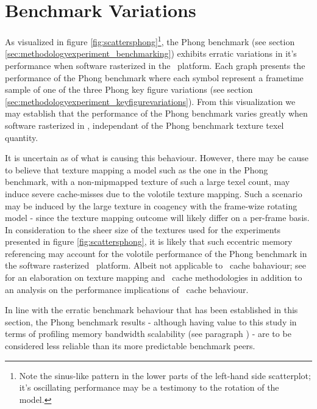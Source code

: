 

\section{Benchmark Variations}
\label{sec:results_benchmarkvariations}
As visualized in figure \ref{fig:scattersphong}\footnote{Note the sinus-like pattern in the lower parts of the left-hand side scatterplot; it's oscillating performance may be a testimony to the rotation of the model.}, the Phong benchmark (see section \ref{sec:methodologyexperiment_benchmarking}) exhibits erratic variations in it's performance when software rasterized in the \dvttermsimics\ platform.
Each graph presents the performance of the Phong benchmark where each symbol represent a frametime sample of one of the three Phong key figure variations (see section \ref{sec:methodologyexperiment_keyfigurevariations}).
From this visualization we may establish that the performance of the Phong benchmark varies greatly when software rasterized in \dvttermsimics , independant of the Phong benchmark texture texel quantity.

It is uncertain as of what is causing this behaviour.
However, there may be cause to believe that texture mapping a model such as the one in the Phong benchmark, with a non-mipmapped texture of such a large texel count, may induce severe cache-misses due to the volotile texture mapping.
Such a scenario may be induced by the large texture in coagency with the frame-wize rotating model - since the texture mapping outcome will likely differ on a per-frame basis.
In consideration to the sheer size of the textures used for the experiments presented in figure \ref{fig:scattersphong}, it is likely that such eccentric memory referencing may account for the volotile performance of the Phong benchmark in the software rasterized \dvttermsimics\ platform.
Albeit not applicable to \dvttermcpu\ cache bahaviour; see  for an elaboration on texture mapping and \dvttermgpu\ cache methodologies in addition to an analysis on the performance implications of \dvttermgpu\ cache behaviour.

In line with the erratic benchmark behaviour that has been established in this section, the Phong benchmark results - although having value to this study in terms of profiling memory bandwidth scalability (see paragraph ) - are to be considered less reliable than its more predictable benchmark peers.

